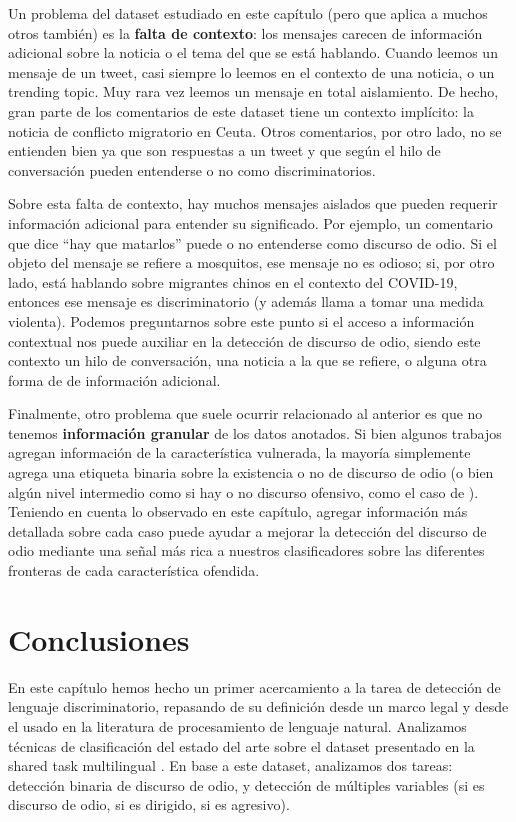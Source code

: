 
Un problema del dataset estudiado en este capítulo (pero que aplica a muchos otros también) es la \textbf{falta de contexto}: los mensajes carecen de información adicional sobre la noticia o el tema del que se está hablando. Cuando leemos un mensaje de un tweet, casi siempre lo leemos en el contexto de una noticia, o un trending topic. Muy rara vez leemos un mensaje en total aislamiento. De hecho, gran parte de los comentarios de este dataset tiene un contexto implícito: la noticia de conflicto migratorio en Ceuta. Otros comentarios, por otro lado, no se entienden bien ya que son respuestas a un tweet y que según el hilo de conversación pueden entenderse o no como discriminatorios.

Sobre esta falta de contexto, hay muchos mensajes aislados que pueden requerir información adicional para entender su significado. Por ejemplo, un comentario que dice ``hay que matarlos'' puede o no entenderse como discurso de odio. Si el objeto del mensaje se refiere a mosquitos, ese mensaje no es odioso; si, por otro lado, está hablando sobre migrantes chinos en el contexto del COVID-19, entonces ese mensaje es discriminatorio (y además llama a tomar una medida violenta). Podemos preguntarnos sobre este punto si el acceso a información contextual nos puede auxiliar en la detección de discurso de odio, siendo este contexto un hilo de conversación, una noticia a la que se refiere, o alguna otra forma de de información adicional.

Finalmente, otro problema que suele ocurrir relacionado al anterior es que no tenemos \textbf{información granular} de los datos anotados. Si bien algunos trabajos agregan información de la característica vulnerada, la mayoría simplemente agrega una etiqueta binaria sobre la existencia o no de discurso de odio (o bien algún nivel intermedio como si hay o no discurso ofensivo, como el caso de \citet{Davidson2017AutomatedHS}). Teniendo en cuenta lo observado en este capítulo, agregar información más detallada sobre cada caso puede ayudar a mejorar la detección del discurso de odio mediante una señal más rica a nuestros clasificadores sobre las diferentes fronteras de cada característica ofendida.


\section{Conclusiones}

En este capítulo hemos hecho un primer acercamiento a la tarea de detección de lenguaje discriminatorio, repasando de su definición desde un marco legal y desde el usado en la literatura de procesamiento de lenguaje natural. Analizamos técnicas de clasificación del estado del arte sobre el dataset presentado en la shared task multilingual \cite{hateval2019semeval}. En base a este dataset, analizamos dos tareas: detección binaria de discurso de odio, y detección de múltiples variables (si es discurso de odio, si es dirigido, si es agresivo).

